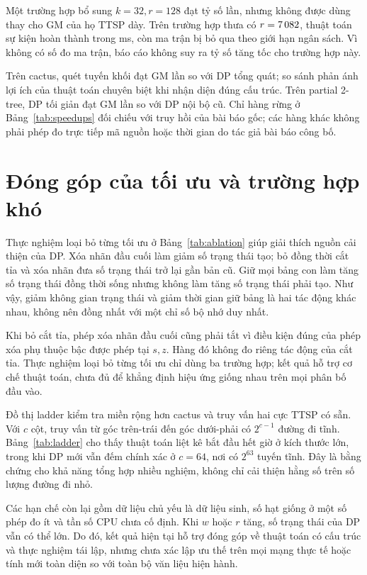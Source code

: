 Một trường hợp bổ sung $k=32,r=128$ đạt tỷ số \TTSPExtraSpeed{} lần, nhưng không được dùng thay cho GM của họ TTSP dày. Trên trường hợp thưa có $r=7\,082$, thuật toán sự kiện hoàn thành trong \TTSPSparseTime{} ms, còn ma trận bị bỏ qua theo giới hạn ngân sách. Vì không có số đo ma trận, báo cáo không suy ra tỷ số tăng tốc cho trường hợp này.

Trên cactus, quét tuyến khối đạt GM \CactusGM{} lần so với DP tổng quát; so sánh phản ánh lợi ích của thuật toán chuyên biệt khi nhận diện đúng cấu trúc. Trên partial 2-tree, DP tối giản đạt GM \PartialGM{} lần so với DP nội bộ cũ. Chỉ hàng rừng ở Bảng~\ref{tab:speedups} đối chiếu với truy hồi của bài báo gốc; các hàng khác không phải phép đo trực tiếp mã nguồn hoặc thời gian do tác giả bài báo công bố.

\section{Đóng góp của tối ưu và trường hợp khó}

Thực nghiệm loại bỏ từng tối ưu ở Bảng~\ref{tab:ablation} giúp giải thích nguồn cải thiện của DP. Xóa nhãn đầu cuối làm giảm số trạng thái tạo; bỏ đồng thời cắt tỉa và xóa nhãn đưa số trạng thái trở lại gần bản cũ. Giữ mọi bảng con làm tăng số trạng thái đồng thời sống nhưng không làm tăng số trạng thái phải tạo. Như vậy, giảm không gian trạng thái và giảm thời gian giữ bảng là hai tác động khác nhau, không nên đồng nhất với một chỉ số bộ nhớ duy nhất.



Khi bỏ cắt tỉa, phép xóa nhãn đầu cuối cũng phải tắt vì điều kiện đúng của phép xóa phụ thuộc bậc được phép tại $s,z$. Hàng đó không đo riêng tác động của cắt tỉa. Thực nghiệm loại bỏ từng tối ưu chỉ dùng ba trường hợp; kết quả hỗ trợ cơ chế thuật toán, chưa đủ để khẳng định hiệu ứng giống nhau trên mọi phân bố đầu vào.

Đồ thị ladder kiểm tra miền rộng hơn cactus và truy vấn hai cực TTSP có sẵn. Với $c$ cột, truy vấn từ góc trên-trái đến góc dưới-phải có $2^{c-1}$ đường đi tĩnh. Bảng~\ref{tab:ladder} cho thấy thuật toán liệt kê bắt đầu hết giờ ở kích thước lớn, trong khi DP mới vẫn đếm chính xác ở $c=64$, nơi có $2^{63}$ tuyến tĩnh. Đây là bằng chứng cho khả năng tổng hợp nhiều nghiệm, không chỉ cải thiện hằng số trên số lượng đường đi nhỏ.



Các hạn chế còn lại gồm dữ liệu chủ yếu là dữ liệu sinh, số hạt giống ở một số phép đo ít và tần số CPU chưa cố định. Khi $w$ hoặc $r$ tăng, số trạng thái của DP vẫn có thể lớn. Do đó, kết quả hiện tại hỗ trợ đóng góp về thuật toán có cấu trúc và thực nghiệm tái lập, nhưng chưa xác lập ưu thế trên mọi mạng thực tế hoặc tính mới toàn diện so với toàn bộ văn liệu hiện hành.
